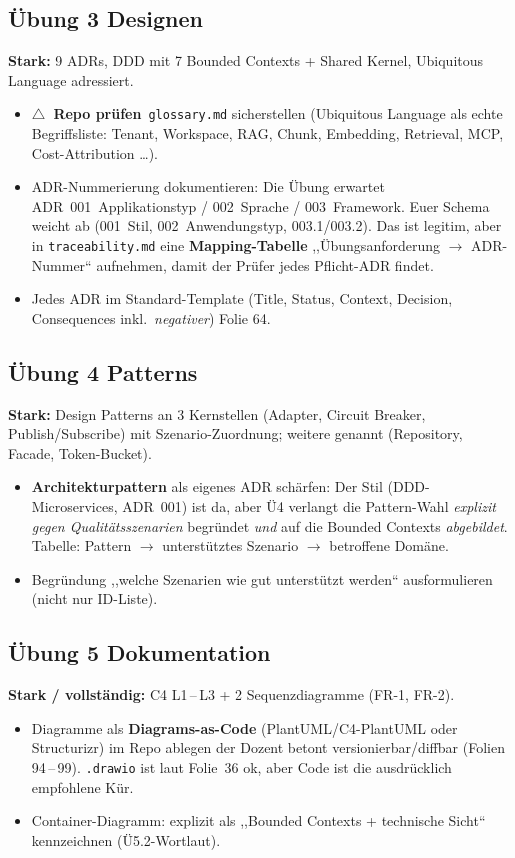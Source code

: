 \documentclass[11pt,a4paper]{article}
\newcommand{\warnref}{\textcolor{warn}{\textbf{$\triangle$\ Repo pr\"ufen}}}
\begin{document}
\subsection*{\"Ubung 3 \textendash{} Designen}
\textbf{Stark:} 9 ADRs, DDD mit 7 Bounded Contexts + Shared Kernel, Ubiquitous
Language adressiert.
\begin{itemize}
  \item \warnref\ \texttt{glossary.md} sicherstellen (Ubiquitous Language als
        echte Begriffsliste: Tenant, Workspace, RAG, Chunk, Embedding, Retrieval,
        MCP, Cost-Attribution \dots).
  \item ADR-Nummerierung dokumentieren: Die \"Ubung erwartet
        ADR~001~Applikationstyp / 002~Sprache / 003~Framework. Euer Schema
        weicht ab (001~Stil, 002~Anwendungstyp, 003.1/003.2). Das ist legitim,
        aber in \texttt{traceability.md} eine \textbf{Mapping-Tabelle}
        ,,\"Ubungsanforderung $\rightarrow$ ADR-Nummer`` aufnehmen, damit der
        Pr\"ufer jedes Pflicht-ADR findet.
  \item Jedes ADR im Standard-Template (Title, Status, Context, Decision,
        Consequences inkl.\ \emph{negativer}) \textendash{} Folie 64.
\end{itemize}

\subsection*{\"Ubung 4 \textendash{} Patterns}
\textbf{Stark:} Design Patterns an 3 Kernstellen (Adapter, Circuit Breaker,
Publish/Subscribe) mit Szenario-Zuordnung; weitere genannt (Repository, Facade,
Token-Bucket).
\begin{itemize}
  \item \textbf{Architekturpattern} als eigenes ADR sch\"arfen: Der Stil
        (DDD-Microservices, ADR~001) ist da, aber \"U4 verlangt die
        Pattern-Wahl \emph{explizit gegen Qualit\"atsszenarien} begr\"undet
        \emph{und} auf die Bounded Contexts \emph{abgebildet}. Tabelle:
        Pattern $\rightarrow$ unterst\"utztes Szenario $\rightarrow$ betroffene
        Dom\"ane.
  \item Begr\"undung ,,welche Szenarien wie gut unterst\"utzt werden`` ausformulieren
        (nicht nur ID-Liste).
\end{itemize}

\subsection*{\"Ubung 5 \textendash{} Dokumentation}
\textbf{Stark / vollst\"andig:} C4 L1\,--\,L3 + 2 Sequenzdiagramme (FR-1, FR-2).
\begin{itemize}
  \item Diagramme als \textbf{Diagrams-as-Code} (PlantUML/C4-PlantUML oder
        Structurizr) im Repo ablegen \textendash{} der Dozent betont versionierbar/diffbar
        (Folien 94\,--\,99). \texttt{.drawio} ist laut Folie~36 ok, aber Code ist die
        ausdr\"ucklich empfohlene Kür.
  \item Container-Diagramm: explizit als ,,Bounded Contexts + technische Sicht``
        kennzeichnen (\"U5.2-Wortlaut).
\end{itemize}
\end{document}
